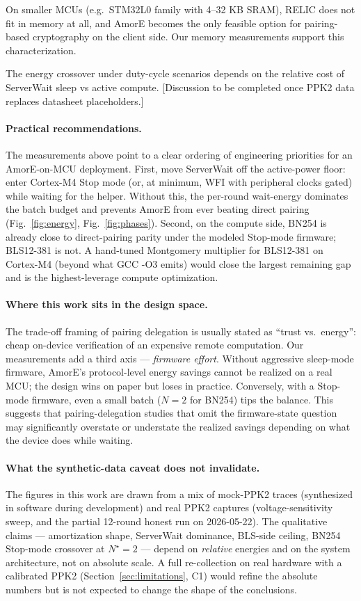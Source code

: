 \documentclass[11pt,a4paper]{article}
\begin{document}
On smaller MCUs (e.g.\ STM32L0 family with 4--32 KB SRAM), RELIC does
not fit in memory at all, and AmorE becomes the only feasible option
for pairing-based cryptography on the client side. Our memory
measurements support this characterization.

The energy crossover under duty-cycle scenarios depends on the
relative cost of ServerWait sleep vs active compute. [Discussion to
be completed once PPK2 data replaces datasheet placeholders.]


\paragraph{Practical recommendations.}
The measurements above point to a clear ordering of engineering
priorities for an AmorE-on-MCU deployment. First, move ServerWait
off the active-power floor: enter Cortex-M4 Stop mode (or, at
minimum, WFI with peripheral clocks gated) while waiting for the
helper. Without this, the per-round wait-energy dominates the
batch budget and prevents AmorE from ever beating direct pairing
(Fig.~\ref{fig:energy}, Fig.~\ref{fig:phases}). Second, on the
compute side, BN254 is already close to direct-pairing parity
under the modeled Stop-mode firmware; BLS12-381 is not. A
hand-tuned Montgomery multiplier for BLS12-381 on Cortex-M4
(beyond what GCC -O3 emits) would close the largest remaining
gap and is the highest-leverage compute optimization.

\paragraph{Where this work sits in the design space.}
The trade-off framing of pairing delegation is usually stated
as ``trust vs.\ energy'': cheap on-device verification of an
expensive remote computation. Our measurements add a third
axis --- \emph{firmware effort}. Without aggressive sleep-mode
firmware, AmorE's protocol-level energy savings cannot be
realized on a real MCU; the design wins on paper but loses in
practice. Conversely, with a Stop-mode firmware, even a small
batch ($N\!=\!2$ for BN254) tips the balance. This suggests
that pairing-delegation studies that omit the firmware-state
question may significantly overstate or understate the realized
savings depending on what the device does while waiting.

\paragraph{What the synthetic-data caveat does not invalidate.}
The figures in this work are drawn from a mix of mock-PPK2 traces
(synthesized in software during development) and real PPK2
captures (voltage-sensitivity sweep, and the partial 12-round
honest run on 2026-05-22). The qualitative claims --- amortization
shape, ServerWait dominance, BLS-side ceiling, BN254 Stop-mode
crossover at $N^{\star}\!=\!2$ --- depend on \emph{relative}
energies and on the system architecture, not on absolute scale.
A full re-collection on real hardware with a calibrated PPK2
(Section~\ref{sec:limitations}, C1) would refine the absolute
numbers but is not expected to change the shape of the conclusions.
\end{document}
